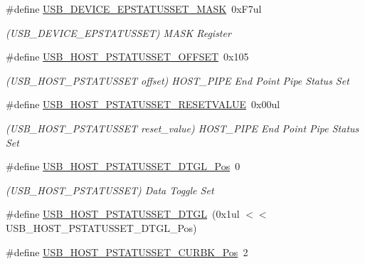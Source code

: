 \begin{DoxyCompactItemize}
\item 
\#define \mbox{\hyperlink{group___s_a_m_d21___u_s_b_gaa9092d794a1a4a16b858480636d7d180}{U\+S\+B\+\_\+\+D\+E\+V\+I\+C\+E\+\_\+\+E\+P\+S\+T\+A\+T\+U\+S\+S\+E\+T\+\_\+\+M\+A\+SK}}~0x\+F7ul
\begin{DoxyCompactList}\small\item\em (U\+S\+B\+\_\+\+D\+E\+V\+I\+C\+E\+\_\+\+E\+P\+S\+T\+A\+T\+U\+S\+S\+ET) M\+A\+SK Register \end{DoxyCompactList}\item 
\#define \mbox{\hyperlink{group___s_a_m_d21___u_s_b_gaf96e2e0fc5fd241cafedc0b434ca113e}{U\+S\+B\+\_\+\+H\+O\+S\+T\+\_\+\+P\+S\+T\+A\+T\+U\+S\+S\+E\+T\+\_\+\+O\+F\+F\+S\+ET}}~0x105
\begin{DoxyCompactList}\small\item\em (U\+S\+B\+\_\+\+H\+O\+S\+T\+\_\+\+P\+S\+T\+A\+T\+U\+S\+S\+ET offset) H\+O\+S\+T\+\_\+\+P\+I\+PE End Point Pipe Status Set \end{DoxyCompactList}\item 
\#define \mbox{\hyperlink{group___s_a_m_d21___u_s_b_ga613399fd9ee1b39ba68a640af1ef4717}{U\+S\+B\+\_\+\+H\+O\+S\+T\+\_\+\+P\+S\+T\+A\+T\+U\+S\+S\+E\+T\+\_\+\+R\+E\+S\+E\+T\+V\+A\+L\+UE}}~0x00ul
\begin{DoxyCompactList}\small\item\em (U\+S\+B\+\_\+\+H\+O\+S\+T\+\_\+\+P\+S\+T\+A\+T\+U\+S\+S\+ET reset\+\_\+value) H\+O\+S\+T\+\_\+\+P\+I\+PE End Point Pipe Status Set \end{DoxyCompactList}\item 
\#define \mbox{\hyperlink{group___s_a_m_d21___u_s_b_ga9c9b367ddba557817552ec11a6c0b0d0}{U\+S\+B\+\_\+\+H\+O\+S\+T\+\_\+\+P\+S\+T\+A\+T\+U\+S\+S\+E\+T\+\_\+\+D\+T\+G\+L\+\_\+\+Pos}}~0
\begin{DoxyCompactList}\small\item\em (U\+S\+B\+\_\+\+H\+O\+S\+T\+\_\+\+P\+S\+T\+A\+T\+U\+S\+S\+ET) Data Toggle Set \end{DoxyCompactList}\item 
\#define \mbox{\hyperlink{group___s_a_m_d21___u_s_b_ga9660d473e4dc92b8b0829d851f60180a}{U\+S\+B\+\_\+\+H\+O\+S\+T\+\_\+\+P\+S\+T\+A\+T\+U\+S\+S\+E\+T\+\_\+\+D\+T\+GL}}~(0x1ul $<$$<$ U\+S\+B\+\_\+\+H\+O\+S\+T\+\_\+\+P\+S\+T\+A\+T\+U\+S\+S\+E\+T\+\_\+\+D\+T\+G\+L\+\_\+\+Pos)
\item 
\#define \mbox{\hyperlink{group___s_a_m_d21___u_s_b_gaf1e75c2eb453896f239918b5fdbf1ba3}{U\+S\+B\+\_\+\+H\+O\+S\+T\+\_\+\+P\+S\+T\+A\+T\+U\+S\+S\+E\+T\+\_\+\+C\+U\+R\+B\+K\+\_\+\+Pos}}~2
$$
\end{DoxyCompactItemize}
